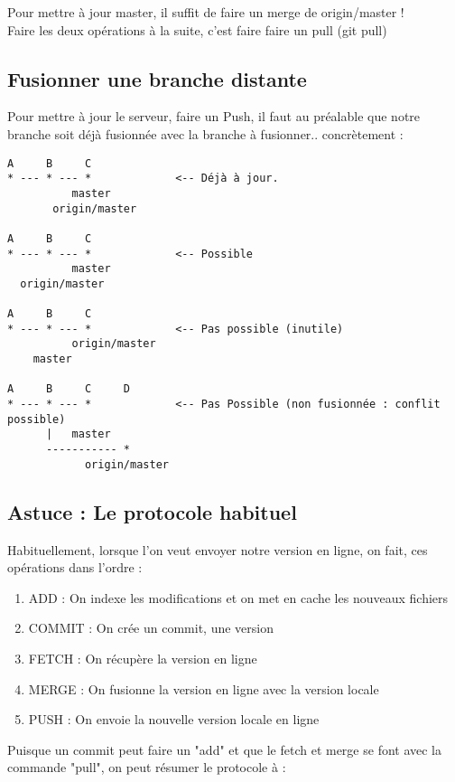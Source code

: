 Pour mettre à jour master, il suffit de faire un merge de origin/master !\\

Faire les deux opérations à la suite, c'est faire faire un pull (git pull)

\subsection{Fusionner une branche distante}
Pour mettre à jour le serveur, faire un Push, il faut au préalable que notre branche soit déjà fusionnée avec la branche à fusionner.. concrètement :
\begin{verbatim}
A     B     C
* --- * --- *             <-- Déjà à jour.
          master
       origin/master

A     B     C
* --- * --- *             <-- Possible
          master   
  origin/master
  
A     B     C
* --- * --- *             <-- Pas possible (inutile)
          origin/master   
    master
           
A     B     C     D
* --- * --- *             <-- Pas Possible (non fusionnée : conflit possible)
      |   master  
      ----------- *     
            origin/master
\end{verbatim}

\subsection{Astuce : Le protocole habituel}
Habituellement, lorsque l'on veut envoyer notre version en ligne, on fait, ces opérations dans l'ordre :

\begin{enumerate}
\item ADD : On indexe les modifications et on met en cache les nouveaux fichiers
\item COMMIT : On crée un commit, une version
\item FETCH : On récupère la version en ligne
\item MERGE : On fusionne la version en ligne avec la version locale
\item PUSH : On envoie la nouvelle version locale en ligne\\
\end{enumerate}

Puisque un commit peut faire un "add" et que le fetch et merge se font avec la commande "pull", on peut résumer le protocole à :\\

